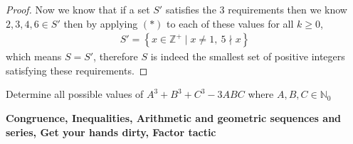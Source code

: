 \documentclass[11pt]{article}
\newenvironment{problem}[2][Problem\!]{\begin{trivlist}
\item[\hskip \labelsep {\bfseries #1}\hskip \labelsep {\bfseries #2}]}{\end{trivlist}}
\newcommand{\zz}{\mathbb Z}   %
\newcommand{\nn}{\mathbb N}   %
\newcommand{\set}[1]{\left\{#1\right\}} %
\renewcommand{\geq}{\geqslant}
\begin{document}
\begin{proof}
    Now we know that if a set $S'$ satisfies the 3 requirements then we know $2,3,4,6 \in S'$ then by applying $(*)$ to each of these values for all $k\geq 0$,
    \begin{align*}
        S' = \set{x \in \zz^{+}\mid x \neq 1, \ 5 \nmid x}
    \end{align*}
    which means $S = S'$, therefore $S$ is indeed the smallest set of positive integers satisfying these requirements.
\end{proof}

\begin{tcolorbox}
    \begin{problem} {IC | 11/29 | PP 28}
        Determine all possible values of $A^{3} + B^{3} + C^{3} - 3ABC$ where $A,B,C \in \nn_0$
    \end{problem}
    \textbf{Congruence, Inequalities, Arithmetic and geometric sequences and series, Get your hands dirty, Factor tactic}
\end{tcolorbox}
\end{document}
